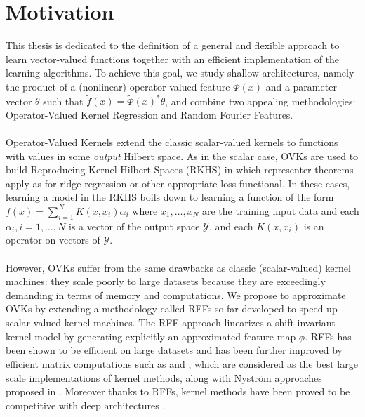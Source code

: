 \section{Motivation}
This thesis is dedicated to the definition of a general and flexible approach
to learn vector-valued functions together with an efficient implementation of
the learning algorithms. To achieve this goal, we study shallow architectures,
namely the product of a (nonlinear) operator-valued feature
$\widetilde{\Phi}(x)$ and a parameter vector $\theta$ such that
$\widetilde{f}(x) = \widetilde{\Phi}(x)^* \theta$, and combine two appealing
methodologies: Operator-Valued Kernel Regression and Random Fourier Features.
\paragraph{}
Operator-Valued Kernels \citep{Micchelli2005,Carmeli2010,Kadri_aistat10,
Brouard2011,Alvarez2012} extend the classic scalar-valued kernels to functions
with values in some \emph{output} Hilbert space. As in the scalar case,
\acfp{OVK} are used to build Reproducing Kernel Hilbert Spaces (\acs{RKHS}) in
which representer theorems apply as for ridge regression or other appropriate
loss functional. In these cases, learning a model in the \acs{RKHS} boils down
to learning a function of the form $f(x)=\sum_{i=1}^N K(x,x_i)\alpha_i$ where
$x_1, \ldots, x_N$ are the training input data and each $\alpha_i, i=1, \ldots,
N$ is a vector of the output space $\mathcal{Y}$, and each $K(x,x_i)$ is an
operator on vectors of $\mathcal{Y}$.
\paragraph{}
However, \acsp{OVK} suffer from the same drawbacks as classic
(sca\-lar-va\-lued) kernel machines: they scale poorly to large datasets
because they are exceedingly demanding in terms of memory and computations. We
propose to approximate OVKs by extending a methodology called \acfp{RFF}
\citep{Rahimi2007, Le2013, Yang2015, sriper2015, Bach2015, sutherland2015,
rudi2016generalization} so far developed to speed up scalar-valued kernel
machines. The \acs{RFF} approach linearizes a shift-invariant kernel model by
generating explicitly an approximated feature map $\tilde{\phi}$. \acsp{RFF}
has been shown to be efficient on large datasets and has been further improved
by efficient matrix computations such as \citep[``FastFood'']{Le2013} and
\citep[``SORF'']{felix2016orthogonal}, which are considered as the best large
scale implementations of kernel methods, along with Nystr\"om approaches
proposed in \citet{drineas2005nystrom}. Moreover thanks to \acsp{RFF}, kernel
methods have been proved to be competitive with deep architectures
\citep{lu2014scale, dai2014scalable, yang2015deep}.

